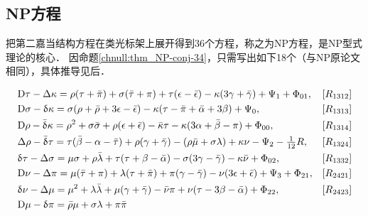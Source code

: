 
\subsection{NP方程}
把第二嘉当结构方程在类光标架上展开得到36个方程，称之为NP方程，是NP型式理论的核心．
因命题\ref{chnull:thm_NP-conj-34}，只需写出如下18个（与NP原论文相同），具体推导见后．
\begin{small}
\setlength{\mathindent}{0em}
\begin{subequations}\label{chnull:eqn_NP-all}
    \begin{align}
        &{\rm D}\tau -\Delta \kappa =  \rho(\tau +\bar{\pi }) +\sigma(\bar{\tau }+\pi )
        +\tau(\epsilon -\bar{\epsilon }) - \kappa(3\gamma +\bar{\gamma } )
        +\Psi _{1} +\Phi_{01},   & [R_{1312}] \label{chnull:eqn_NP-all-R1312} \\
        &{\rm D}\sigma -\updelta \kappa = \sigma(\rho +\bar{\rho } + 3\epsilon - \bar{\epsilon })
        -\kappa(\tau -\bar{\pi }+\bar{\alpha } +3\beta ) +\Psi_{0},
        &[R_{1313}] \label{chnull:eqn_NP-all-R1313} \\
        &{\rm D}\rho -\bar{\updelta }\kappa =  \rho ^{2}+\sigma \bar{\sigma }
        + \rho(\epsilon+\bar{\epsilon }) -\bar{\kappa }\tau
        -\kappa (3\alpha +\bar{\beta }-\pi ) +\Phi_{00},
        &[R_{1314}] \label{chnull:eqn_NP-all-R1314}  \\
        &\Delta \rho -\bar{\updelta }\tau = \tau (\bar{\beta }
        -\alpha -\bar{\tau })+\rho(\gamma +\bar{\gamma })-(\rho \bar{\mu }+\sigma \lambda )
        +\kappa \nu  -\Psi_{2} - \tfrac{1}{12}R,
        & [R_{1324}] \label{chnull:eqn_NP-all-R1324} \\
        &\updelta \tau -\Delta \sigma =\mu \sigma +\rho \bar{\lambda }+\tau (\tau +\beta -\bar{\alpha })
        -\sigma (3\gamma -\bar{\gamma } )-\kappa \bar{\nu } + \Phi_{02},
        & [R_{1332}] \label{chnull:eqn_NP-all-R1332} \\
        &{\rm D}\nu -\Delta \pi = \mu(\bar{\tau }+\pi ) + \lambda(\tau +\bar{\pi } )
        + \pi(\gamma -\bar{\gamma }) - \nu(3\epsilon +\bar{\epsilon } )
         + \Psi _{3} +\Phi_{21},   & [R_{2421}] \label{chnull:eqn_NP-all-R2421} \\
        &\updelta \nu -\Delta \mu =\mu ^{2}+\lambda \bar{\lambda }+\mu (\gamma + \bar{\gamma })
        -\bar{\nu }\pi +\nu (\tau -3\beta -\bar{\alpha }) + \Phi_{22},
        & [R_{2423}] \label{chnull:eqn_NP-all-R2423} \\
        &{\rm D}\mu -\updelta \pi =\bar{\rho }\mu +\sigma \lambda +\pi \bar{\pi }

\end{align}
\end{subequations}
\end{small}
